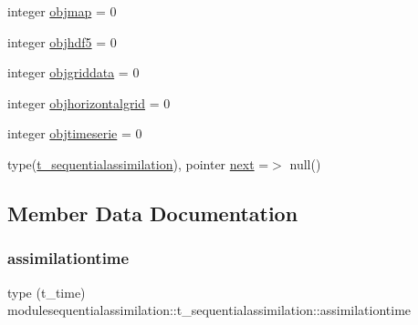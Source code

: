 \begin{DoxyCompactItemize}
\item 
integer \mbox{\hyperlink{structmodulesequentialassimilation_1_1t__sequentialassimilation_a8f1ff6eb25010f8d4326af1b6adbd984}{objmap}} = 0
\item 
integer \mbox{\hyperlink{structmodulesequentialassimilation_1_1t__sequentialassimilation_ac03f123f27194be5f24c5b3b84644ed9}{objhdf5}} = 0
\item 
integer \mbox{\hyperlink{structmodulesequentialassimilation_1_1t__sequentialassimilation_ab7e0153903334b63c122d6bdd20208d1}{objgriddata}} = 0
\item 
integer \mbox{\hyperlink{structmodulesequentialassimilation_1_1t__sequentialassimilation_ad82139e542def8fde4d2572e99010136}{objhorizontalgrid}} = 0
\item 
integer \mbox{\hyperlink{structmodulesequentialassimilation_1_1t__sequentialassimilation_a979d77eef76b714b1278940ed8f32e64}{objtimeserie}} = 0
\item 
type(\mbox{\hyperlink{structmodulesequentialassimilation_1_1t__sequentialassimilation}{t\+\_\+sequentialassimilation}}), pointer \mbox{\hyperlink{structmodulesequentialassimilation_1_1t__sequentialassimilation_a1252fe6b96af5f9e702f8f7fe574313e}{next}} =$>$ null()
\end{DoxyCompactItemize}


\subsection{Member Data Documentation}
\mbox{\label{structmodulesequentialassimilation_1_1t__sequentialassimilation_a254ebae232ce599996eb3c518af35b84}} 
\subsubsection{\texorpdfstring{assimilationtime}{assimilationtime}}
{\footnotesize\ttfamily type (t\+\_\+time) modulesequentialassimilation\+::t\+\_\+sequentialassimilation\+::assimilationtime\hspace{0.3cm}{\ttfamily [private]}}

\mbox{\label{structmodulesequentialassimilation_1_1t__sequentialassimilation_a043d6d4f7cef3964e1bd3ebdfeac5a25}} 
